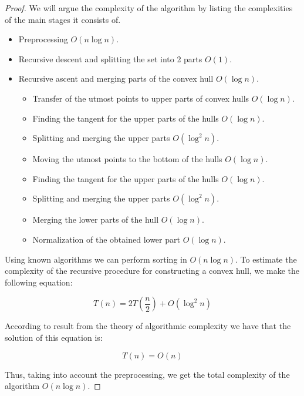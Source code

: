 \documentclass[conference]{IEEEtran}
\theoremstyle{plane}
\begin{document}
		\begin{proof}
			We will argue the complexity of the algorithm by listing the complexities of the main stages it consists of.
			
			\begin{itemize}
				\item
				Preprocessing $O(n\log n)$.
				\item
				Recursive descent and splitting the set into 2 parts $O(1)$.
				\item
				Recursive ascent and merging parts of the convex hull $O(\log n)$.
				\begin{itemize}
					\item
					Transfer of the utmost points to upper parts of convex hulls $O(\log n)$.
					\item
					Finding the tangent for the upper parts of the hulls $O(\log n)$.
					\item
					Splitting and merging the upper parts $O(\log^2 n)$.
					\item
					Moving the utmost points to the bottom of the hulls $O(\log n)$.
					\item
					Finding the tangent for the upper parts of the hulls $O(\log n)$.
					\item
					Splitting and merging the upper parts $O(\log^2 n)$.
					\item
					Merging the lower parts of the hull $O(\log n)$.
					\item
					Normalization of the obtained lower part $O(\log n)$.
				\end{itemize}
			\end{itemize}
			
			Using known algorithms we can perform sorting in $O(n\log n)$. To estimate the complexity of the recursive procedure for constructing a convex hull, we make the following equation:
			
			\begin{equation}
			  T(n) = 2T(\frac{n}{2}) + O(\log^2 n)
			\end{equation}
			
			According to result from the theory of algorithmic complexity we have that the solution of this equation is:
			
			\begin{equation}
			  T(n)=O(n)
			\end{equation}
			
			Thus, taking into account the preprocessing, we get the total complexity of the algorithm $O(n\log n)$.
		\end{proof}
		
\end{document}
